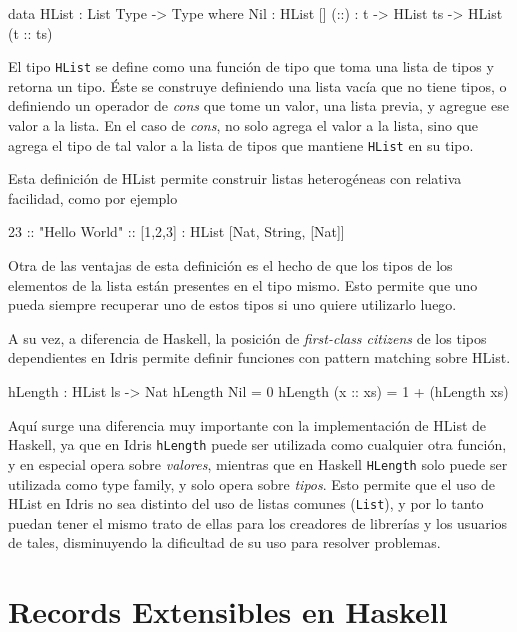 \begin{code}
data HList : List Type -> Type where
  Nil : HList []
  (::) : t -> HList ts -> HList (t :: ts)
\end{code}

El tipo \texttt{HList} se define como una función de tipo que toma una lista de tipos y retorna un tipo. Éste se construye definiendo una lista vacía que no tiene tipos, o definiendo un operador de \textit{cons} que tome un valor, una lista previa, y agregue ese valor a la lista. En el caso de \textit{cons}, no solo agrega el valor a la lista, sino que agrega el tipo de tal valor a la lista de tipos que mantiene \texttt{HList} en su tipo.

Esta definición de HList permite construir listas heterogéneas con relativa facilidad, como por ejemplo 

\begin{code}
23 :: "Hello World" :: [1,2,3] :
    HList [Nat, String, [Nat]]
\end{code}

Otra de las ventajas de esta definición es el hecho de que los tipos de los elementos de la lista están presentes en el tipo mismo. Esto permite que uno pueda siempre recuperar uno de estos tipos si uno quiere utilizarlo luego.

A su vez, a diferencia de Haskell, la posición de \textit{first-class citizens} de los tipos dependientes en Idris permite definir funciones con pattern matching sobre HList.

\begin{code}
hLength : HList ls -> Nat
hLength Nil = 0
hLength (x :: xs) = 1 + (hLength xs)
\end{code}

Aquí surge una diferencia muy importante con la implementación de HList de Haskell, ya que en Idris \texttt{hLength} puede ser utilizada como cualquier otra función, y en especial opera sobre \textit{valores}, mientras que en Haskell \texttt{HLength} solo puede ser utilizada como type family, y solo opera sobre \textit{tipos}.
Esto permite que el uso de HList en Idris no sea distinto del uso de listas comunes (\texttt{List}), y por lo tanto puedan tener el mismo trato de ellas para los creadores de librerías y los usuarios de tales, disminuyendo la dificultad de su uso para resolver problemas.

\section{Records Extensibles en Haskell}

